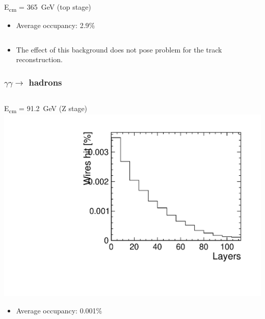 \documentclass[hyperref={colorlinks=true,pdfpagelabels=false,linkcolor=black}, xcolor=dvipsnames,10pt]{beamer}
\begin{document}
\begin{frame}
\begin{columns}
\begin{block}{E\textsubscript{cm} = 365~GeV (top stage)}
      \begin{itemize}
        \item Average occupancy: 2.9\%
      \end{itemize}
    \end{block}

  \end{columns}

  \begin{itemize}
    \item The effect of this background does not pose problem for the track reconstruction.
  \end{itemize}

\end{frame}

\begin{frame}
	\frametitle{$\gamma\gamma\rightarrow$ hadrons}

  \begin{columns}
      \begin{block}{E\textsubscript{cm} = 91.2~GeV (Z stage)}
        \centering
        \includegraphics[width=\textwidth]{./figures/Hadrons_SL_Z.pdf}

        \begin{itemize}
          \item Average occupancy: 0.001\%
        \end{itemize}
      \end{block}


\end{columns}
\end{frame}
\end{document}
